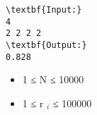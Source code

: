 \begin{verbatim}
\textbf{Input:}
4
2 2 2 2
\textbf{Output:}
0.828
\end{verbatim}
\begin{itemize}
	\item     1 ≤ N ≤ 10000   
	\item     1 ≤ r    $_     i    $    ≤ 100000   
\end{itemize}